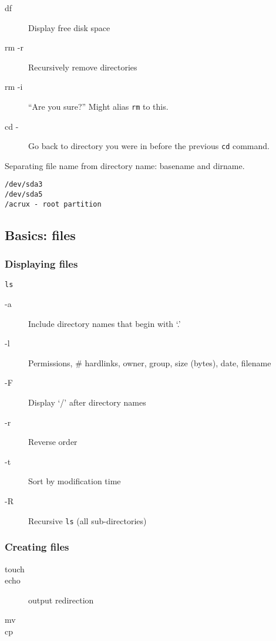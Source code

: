 \documentclass{article}
\begin{document}
\begin{description}
    \item [df] Display free disk space
    \item [rm -r] Recursively remove directories
    \item [rm -i] ``Are you sure?'' Might alias \verb|rm| to this.
    \item [cd -] Go back to directory you were in before the previous
        \verb|cd| command.
\end{description}

Separating file name from directory name: basename and dirname.

\begin{verbatim}
/dev/sda3
/dev/sda5
/acrux - root partition
\end{verbatim}

\subsection{Basics: files}
\subsubsection{Displaying files}
\verb|ls|
\begin{description}
    \item [-a] Include directory names that begin with `.'
    \item [-l] Permissions, \# hardlinks, owner, group, size (bytes),
        date, filename
    \item [-F] Display `/' after directory names
    \item [-r] Reverse order
    \item [-t] Sort by modification time
    \item [-R] Recursive \verb|ls| (all sub-directories)
\end{description}

\subsubsection{Creating files}
\begin{description}
    \item [touch]
    \item [echo] output redirection
    \item [mv]
    \item [cp]
\end{description}
\end{document}
